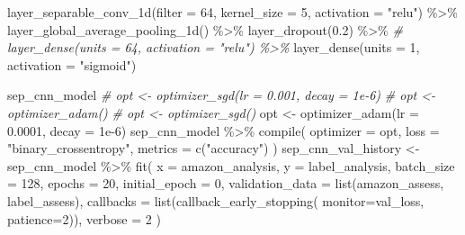 \documentclass[
]{article}
\newenvironment{Shaded}{}{}
\newcommand{\AttributeTok}[1]{\textcolor[rgb]{0.49,0.56,0.16}{#1}}
\newcommand{\CommentTok}[1]{\textcolor[rgb]{0.38,0.63,0.69}{\textit{#1}}}
\newcommand{\DecValTok}[1]{\textcolor[rgb]{0.25,0.63,0.44}{#1}}
\newcommand{\FloatTok}[1]{\textcolor[rgb]{0.25,0.63,0.44}{#1}}
\newcommand{\FunctionTok}[1]{\textcolor[rgb]{0.02,0.16,0.49}{#1}}
\newcommand{\NormalTok}[1]{#1}
\newcommand{\OtherTok}[1]{\textcolor[rgb]{0.00,0.44,0.13}{#1}}
\newcommand{\SpecialCharTok}[1]{\textcolor[rgb]{0.25,0.44,0.63}{#1}}
\newcommand{\StringTok}[1]{\textcolor[rgb]{0.25,0.44,0.63}{#1}}
\begin{document}
\begin{Shaded}
\begin{Highlighting}[]
  \FunctionTok{layer\_separable\_conv\_1d}\NormalTok{(}\AttributeTok{filter =} \DecValTok{64}\NormalTok{, }\AttributeTok{kernel\_size =} \DecValTok{5}\NormalTok{, }\AttributeTok{activation =} \StringTok{"relu"}\NormalTok{) }\SpecialCharTok{\%\textgreater{}\%}
  \FunctionTok{layer\_global\_average\_pooling\_1d}\NormalTok{() }\SpecialCharTok{\%\textgreater{}\%} 
  \FunctionTok{layer\_dropout}\NormalTok{(}\FloatTok{0.2}\NormalTok{) }\SpecialCharTok{\%\textgreater{}\%}
  \CommentTok{\# layer\_dense(units = 64, activation = "relu") \%\textgreater{}\%}
  \FunctionTok{layer\_dense}\NormalTok{(}\AttributeTok{units =} \DecValTok{1}\NormalTok{, }\AttributeTok{activation =} \StringTok{"sigmoid"}\NormalTok{)}

\NormalTok{sep\_cnn\_model}
\CommentTok{\# opt \textless{}{-} optimizer\_sgd(lr = 0.001, decay = 1e{-}6)}
\CommentTok{\# opt \textless{}{-} optimizer\_adam()}
\CommentTok{\# opt \textless{}{-} optimizer\_sgd()}
\NormalTok{opt }\OtherTok{\textless{}{-}} \FunctionTok{optimizer\_adam}\NormalTok{(}\AttributeTok{lr =} \FloatTok{0.0001}\NormalTok{, }\AttributeTok{decay =} \FloatTok{1e{-}6}\NormalTok{)}
\NormalTok{sep\_cnn\_model }\SpecialCharTok{\%\textgreater{}\%} \FunctionTok{compile}\NormalTok{(}
  \AttributeTok{optimizer =}\NormalTok{ opt,}
  \AttributeTok{loss =} \StringTok{"binary\_crossentropy"}\NormalTok{,}
  \AttributeTok{metrics =} \FunctionTok{c}\NormalTok{(}\StringTok{"accuracy"}\NormalTok{)}
\NormalTok{)}
\NormalTok{sep\_cnn\_val\_history }\OtherTok{\textless{}{-}}\NormalTok{ sep\_cnn\_model }\SpecialCharTok{\%\textgreater{}\%}
  \FunctionTok{fit}\NormalTok{(}
    \AttributeTok{x =}\NormalTok{ amazon\_analysis,}
    \AttributeTok{y =}\NormalTok{ label\_analysis,}
    \AttributeTok{batch\_size =} \DecValTok{128}\NormalTok{,}
    \AttributeTok{epochs =} \DecValTok{20}\NormalTok{,}
    \AttributeTok{initial\_epoch =} \DecValTok{0}\NormalTok{,}
    \AttributeTok{validation\_data =} \FunctionTok{list}\NormalTok{(amazon\_assess, label\_assess),}
    \AttributeTok{callbacks =} \FunctionTok{list}\NormalTok{(}\FunctionTok{callback\_early\_stopping}\NormalTok{(}
        \AttributeTok{monitor=}\StringTok{\textquotesingle{}val\_loss\textquotesingle{}}\NormalTok{, }\AttributeTok{patience=}\DecValTok{2}\NormalTok{)),}
    \AttributeTok{verbose =} \DecValTok{2}
\NormalTok{  )}


\end{Highlighting}
\end{Shaded}
\end{document}
